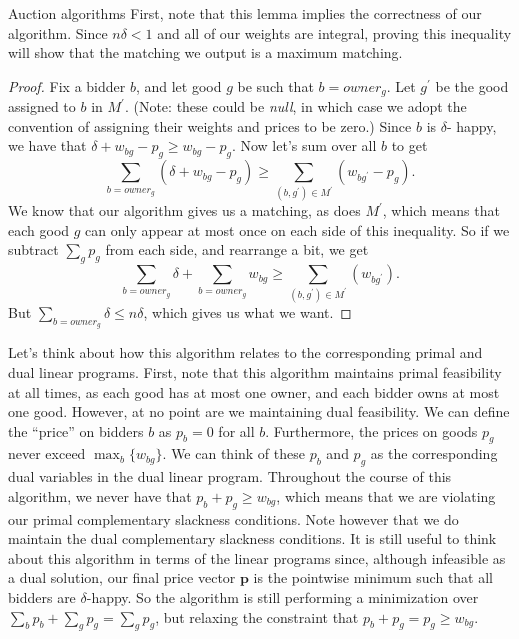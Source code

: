 \documentclass[11pt]{article}
\renewcommand{\'}{^{'}}
\begin{document}
\begin{section}{Auction algorithms}
	First, note that this lemma implies the correctness of our algorithm. Since $n\delta < 1$ 
	and all of our weights are integral, proving this inequality will show that the matching we 
	output is a maximum matching.
	\begin{proof}
		Fix a bidder $b$, and let good $g$ be such that $b = owner_g$. Let $g\'$ be the good 
		assigned to $b$ in $M\'$. (Note: these could be \emph{null}, in which case we adopt the 
		convention of assigning their weights and prices to be zero.) Since $b$ is $\delta$-
		happy, we have that $\delta + w_{bg} - p_g \geq w_{bg} - p_g$. Now let's sum over all 
		$b$ to get 
		\[
			\sum_{b=owner_g} (\delta + w_{bg} - p_g) \geq \sum_{(b,g\')\in M\'} (w_{bg\'} - 
			p_g).
		\]
		We know that our algorithm gives us a matching, as does $M\'$, which means that each 
		good $g$ can only appear at most once on each side of this inequality. So if we subtract 
		$\sum_g p_g$ from each side, and rearrange a bit, we get 
		\[
			\sum_{b=owner_g} \delta + \sum_{b=owner_g} w_{bg} \geq \sum_{(b,g\')\in M\'} 
			(w_{bg\'}). 
		\]
		But $\sum_{b=owner_g} \delta \leq n\delta$, which gives us what we want.
	\end{proof}
	Let's think about how this algorithm relates to the corresponding primal and dual linear 
	programs. First, note that this algorithm maintains primal feasibility at all times, as each 
	good has at most one owner, and each bidder owns at most one good. However, at no point are we 
	maintaining dual feasibility. We can define the ``price'' on bidders $b$ as $p_b = 0$ for all 
	$b$. Furthermore, the prices on goods $p_g$ never exceed $\max_{b} \{w_{bg}\}$. We can think of 
	these $p_b$ and $p_g$ as the corresponding dual variables in the dual linear program. 
	Throughout the course of this algorithm, we never have that $p_b + p_g \geq w_{bg}$, which 
	means that we are violating our primal complementary slackness conditions. Note however that 
	we do maintain the dual complementary slackness conditions. 
	It is still useful to think about this algorithm in terms of the linear programs since, although 
	infeasible as a dual solution, our final price vector $\mathbf{p}$ is the pointwise minimum 
	such that all bidders are $\delta$-happy. So the algorithm is still performing a minimization 
	over $\sum_b p_b + \sum_g p_g = \sum_g p_g$, but relaxing the constraint that $p_b + p_g = 
	p_g \geq w_{bg}$.\\
\end{section}
\end{document}
